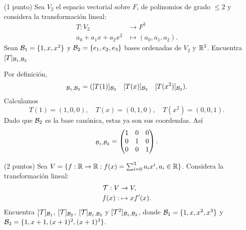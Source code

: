 \documentclass[12pt,a4paper]{article}
\begin{document}
    \begin{mdframed}[style=mdpinkbox,frametitle={Ejercicio 2}]
        (1 punto) Sea $V_{2}$ el espacio vectorial sobre $F$, de polinomios de grado $\leq2$ y
        considera la transformación lineal:
        \begin{align*}
            T:V_{2}&\to F^{3}\\
            a_{0}+a_{1}x+a_{2}x^{2}&\mapsto(a_{0},a_{1},a_{2}).
        \end{align*}
        Sean $\mathcal{B}_{1}=\{1,x,x^{2}\}$ y $\mathcal{B}_{2}=\{e_{1},e_{2},e_{3}\}$ bases ordenadas de $V_{2}$
        y $\mathbb{R}^{3}$. Encuentra $[T]_{\mathcal{B}_{1},\mathcal{B}_{2}}$
    \end{mdframed}

    \begin{solucion}
        Por definición,
        \begin{equation*}
            [T]_{\BB_{1},\BB_{2}}=([T(1)]_{\BB_{2}}\quad[T(x)]_{\BB_{2}}\quad[T(x^{2})]_{\BB_{2}}).
        \end{equation*}
        Calculamos
        \begin{equation*}
            T(1)=(1,0,0),\quad T(x)=(0,1,0),\quad T(x^{2})=(0,0,1).
        \end{equation*}
        Dado que $\mathcal{B}_{2}$ es la base canónica, estas ya son sus coordendas. Así
        \begin{equation*}
            [T]_{\BB_{1},\BB_{2}}=
            \begin{pmatrix}
                1 & 0 & 0\\
                0 & 1 & 0\\
                0 & 0 & 1
            \end{pmatrix}.
        \end{equation*}
    \end{solucion}

    \begin{mdframed}[style=mdpinkbox,frametitle={Ejercicio 3}]
        (2 puntos) Sea $V=\{f:\mathbb{R}\to\mathbb{R}:f(x)=\sum_{i=0}^{3}a_{i}x^{i},a_{i}\in\mathbb{R}\}$. Considera la
        transformación lineal:
        \begin{align*}
            \mathcal{T}:V&\to V,\\
            f(x):&\mapsto xf^{\prime}(x).
        \end{align*}
        Encuentra $[\mathcal{T}]_{\mathcal{B}_{1}}$, $[\mathcal{T}]_{\mathcal{B}_{2}}$, $[\mathcal{T}]_{\mathcal{B}_{1},\mathcal{B}_{2}}$ y
        $[\mathcal{T}^{2}]_{\mathcal{B}_{1},\mathcal{B}_{2}}$, donde $\mathcal{B}_{1}=\{1,x,x^{2},x^{3}\}$ y $\mathcal{B}_{2}=\{1,x+1,(x+1)^{2},(x+1)^{3}\}$.
    \end{mdframed}
\end{document}
